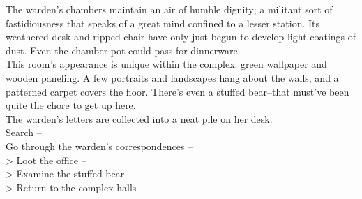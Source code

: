 The warden's chambers maintain an air of humble dignity; a militant sort of fastidiousness that speaks of a great mind confined to a lesser station. Its weathered desk and ripped chair have only just begun to develop light coatings of dust. Even the chamber pot could pass for dinnerware.\\

This room's appearance is unique within the complex: green wallpaper and wooden paneling. A few portraits and landscapes hang about the walls, and a patterned carpet covers the floor. There’s even a stuffed bear--that must’ve been quite the chore to get up here.\\

The warden’s letters are collected into a neat pile on her desk.\\

 Search -- \\
 Go through the warden’s correspondences -- \\
> Loot the office -- \\
> Examine the stuffed bear -- \\
> Return to the complex halls -- 